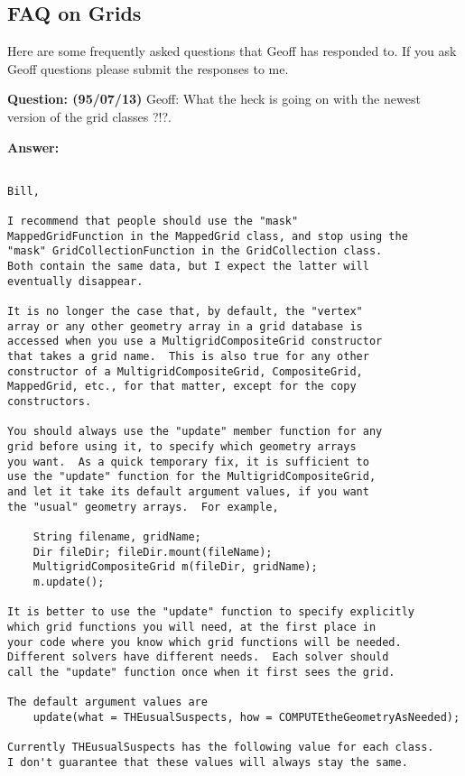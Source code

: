 \subsection{FAQ on Grids}

Here are some frequently asked questions that Geoff has responded to. 
If you ask Geoff questions please submit the responses to me.

\noindent 
{\bf Question: (95/07/13)} Geoff: What the heck is going on with the newest version
of the grid classes ?!?.

\noindent
{\bf Answer:}
{\footnotesize
\begin{verbatim}

Bill,

I recommend that people should use the "mask"
MappedGridFunction in the MappedGrid class, and stop using the
"mask" GridCollectionFunction in the GridCollection class.
Both contain the same data, but I expect the latter will
eventually disappear.

It is no longer the case that, by default, the "vertex"
array or any other geometry array in a grid database is
accessed when you use a MultigridCompositeGrid constructor
that takes a grid name.  This is also true for any other
constructor of a MultigridCompositeGrid, CompositeGrid,
MappedGrid, etc., for that matter, except for the copy
constructors.

You should always use the "update" member function for any
grid before using it, to specify which geometry arrays
you want.  As a quick temporary fix, it is sufficient to
use the "update" function for the MultigridCompositeGrid,
and let it take its default argument values, if you want
the "usual" geometry arrays.  For example,

    String filename, gridName;
    Dir fileDir; fileDir.mount(fileName);
    MultigridCompositeGrid m(fileDir, gridName);
    m.update();

It is better to use the "update" function to specify explicitly
which grid functions you will need, at the first place in
your code where you know which grid functions will be needed.
Different solvers have different needs.  Each solver should
call the "update" function once when it first sees the grid.

The default argument values are
    update(what = THEusualSuspects, how = COMPUTEtheGeometryAsNeeded);

Currently THEusualSuspects has the following value for each class.
I don't guarantee that these values will always stay the same.


\end{verbatim}}
